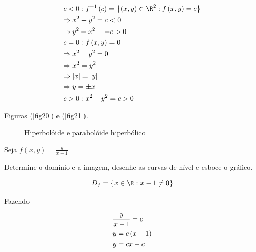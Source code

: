 \documentclass{book}
\begin{document}
\begin{sol}
\[
\begin{gathered}
  c < 0:f^{ - 1} \left( c \right) = \left\{ {\left( {x,y} \right) \in \R^2 :f\left( {x,y} \right) = c} \right\} \hfill \\
\Rightarrow x^2  - y^2  = c < 0 \hfill \\
\Rightarrow y^2  - x^2  =  - c > 0 \hfill \\
c = 0:f\left( {x,y} \right) = 0 \hfill \\
\Rightarrow x^2  - y^2  = 0 \hfill \\
\Rightarrow x^2  = y^2  \hfill \\
\Rightarrow \left| x \right| = \left| y \right| \hfill \\
\Rightarrow y =  \pm x \hfill \\
c > 0:x^2  - y^2  = c > 0 \hfill \\
\end{gathered}
\]

Figuras (\ref{fig20}) e (\ref{fig21}).

\begin{figure}[!h]
  \centering
  \quad
  \caption{Hiperbol\'oide e parabol\'oide hiperb\'olico}
\end{figure}

\end{sol}

\begin{ex}
Seja $\displaystyle f\left( {x,y} \right) = \frac{y}{x - 1}$

Determine o dom\'inio e a imagem, desenhe as curvas de n\'ivel e esboce o gr\'afico.
\end{ex}

\newpage 

\begin{sol}
\[
D_f  = \left\{ {x \in \R:x - 1 \ne 0} \right\}
\]

Fazendo

\[
\begin{gathered}
\frac{y}
{{x - 1}} = c \hfill \\
y = c\left( {x - 1} \right) \hfill \\
y = cx - c \hfill \\
\end{gathered}
\]



\end{sol}
\end{document}

